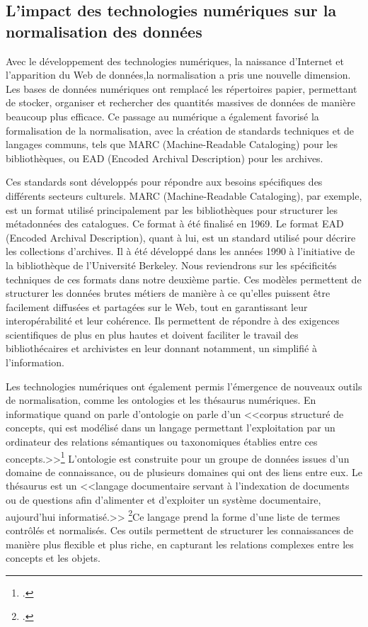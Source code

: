 \subsection{L’impact des technologies numériques sur la normalisation des données}
Avec le développement des technologies numériques, la naissance d’Internet et l'apparition du Web de données,la normalisation a pris une nouvelle dimension. Les bases de données numériques ont remplacé les répertoires papier, permettant de stocker, organiser et rechercher des quantités massives de données de manière beaucoup plus efficace. Ce passage au numérique a également favorisé la formalisation de la normalisation, avec la création de standards techniques et de langages communs, tels que MARC (Machine-Readable Cataloging) pour les bibliothèques, ou EAD (Encoded Archival Description) pour les archives. \newline

Ces standards sont développés pour répondre aux besoins spécifiques des différents secteurs culturels. MARC (Machine-Readable Cataloging), par exemple, est un format utilisé principalement par les bibliothèques pour structurer les métadonnées des catalogues. Ce format  à été finalisé en 1969. Le format EAD (Encoded Archival Description), quant à lui, est un standard utilisé pour décrire les collections d'archives. Il à été développé dans les années 1990 à l’initiative de la bibliothèque de l’Université Berkeley. Nous reviendrons sur les spécificités techniques de ces formats dans notre deuxième partie.
Ces modèles permettent de structurer les données brutes métiers de manière à ce qu'elles puissent être facilement diffusées et partagées sur le Web, tout en garantissant leur interopérabilité et leur cohérence. Ils permettent de répondre à des exigences scientifiques de plus en plus hautes et doivent faciliter le travail des bibliothécaires et archivistes en leur donnant notamment, un simplifié à l'information. \newline

Les technologies numériques ont également permis l’émergence de nouveaux outils de normalisation, comme les ontologies et les thésaurus numériques. En informatique quand on parle d’ontologie on parle d’un <<corpus structuré de concepts, qui est modélisé dans un langage permettant l’exploitation par un ordinateur des relations sémantiques ou taxonomiques établies entre ces concepts.>>\footcite{ontologie} L’ontologie est construite pour un groupe de données issues d’un domaine de connaissance, ou de plusieurs domaines qui ont des liens entre eux. Le thésaurus est un <<langage documentaire servant à l'indexation de documents ou de questions afin d'alimenter et d'exploiter un système documentaire, aujourd'hui informatisé.>> \footcite{thesaurus}Ce langage prend la forme d’une liste de termes contrôlés et normalisés.
Ces outils permettent de structurer les connaissances de manière plus flexible et plus riche, en capturant les relations complexes entre les concepts et les objets.\newline

